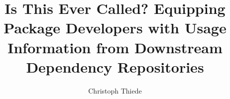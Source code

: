 \title[Downstream Dependency Mining]{Is This Ever Called? Equipping Package Developers with Usage Information from Downstream Dependency Repositories}

\author{Christoph Thiede}

\renewcommand{\shortauthors}{Christoph Thiede}
